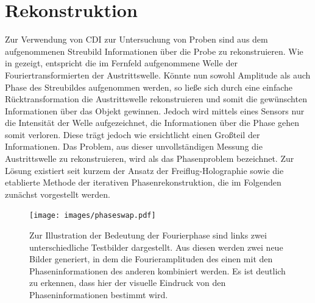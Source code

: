 \chapter{Rekonstruktion}
\label{chap:rekonstruktion}
Zur Verwendung von CDI zur Untersuchung von Proben sind aus dem aufgenommenen Streubild Informationen über die Probe zu rekonstruieren. Wie in  gezeigt, entspricht die im Fernfeld aufgenommene Welle der Fouriertransformierten der Austrittswelle. Könnte nun sowohl Amplitude als auch Phase des Streubildes aufgenommen werden, so ließe sich durch eine einfache Rücktransformation die Austrittswelle rekonstruieren und somit die gewünschten Informationen über das Objekt gewinnen. Jedoch wird mittels eines Sensors nur die Intensität der Welle aufgezeichnet, die Informationen über die Phase gehen somit verloren. Diese trägt jedoch wie  ersichtlicht einen Großteil der Informationen. Das Problem, aus dieser unvollständigen Messung die Austrittswelle zu rekonstruieren, wird als das Phasenproblem bezeichnet. Zur Lösung existiert seit kurzem der Ansatz der Freiflug-Holographie sowie die etablierte Methode der iterativen Phasenrekonstruktion, die im Folgenden zunächst vorgestellt werden.

\begin{figure}
	\centering
	\texttt{[image: images/phaseswap.pdf]}
	\caption[Bedeutung der Fourierphase]{Zur Illustration der Bedeutung der Fourierphase sind links zwei unterschiedliche Testbilder dargestellt. Aus diesen werden zwei neue Bilder generiert, in dem die Fourieramplituden des einen mit den Phaseninformationen des anderen kombiniert werden. Es ist deutlich zu erkennen, dass hier der visuelle Eindruck von den Phaseninformationen bestimmt wird.}
	\label{fig:phaseswap}
\end{figure}
